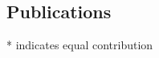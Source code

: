 \documentclass[margin,line,letterpaper]{resume}
\begin{document}
\begin{resume}







    \renewcommand*{\thefootnote}{\fnsymbol{footnote}}
    \section{\mysidestyle Publications}

\newcommand\blfootnote[1]{%
  \begingroup
  \renewcommand\thefootnote{}\footnote{#1}%
  \addtocounter{footnote}{-1}%
  \endgroup
}
    
\def\FormatName#1{%
  \def\myname{Siavash Mirarab}
  \def\mynamee{Siavash Mirarab*}%
  \edef\name{#1}%
  \ifx\name\myname
   \underline{#1}%
  \else
    \ifx\name\mynamee
       \underline{Siavash Mirarab}*
    \else
      #1%
    \fi
  \fi
}

\begin{footnotesize}
* indicates equal contribution
	\vspace{-20pt}
	\begin{spacing}{-1}
	
	\end{spacing}
\end{footnotesize}





\end{resume}
\end{document}
